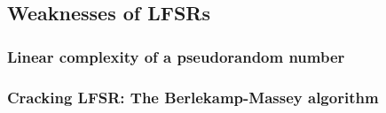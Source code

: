 \subsection{Weaknesses of LFSRs}

\subsubsection{Linear complexity of a pseudorandom number}

\subsubsection{Cracking LFSR: The Berlekamp-Massey algorithm}
